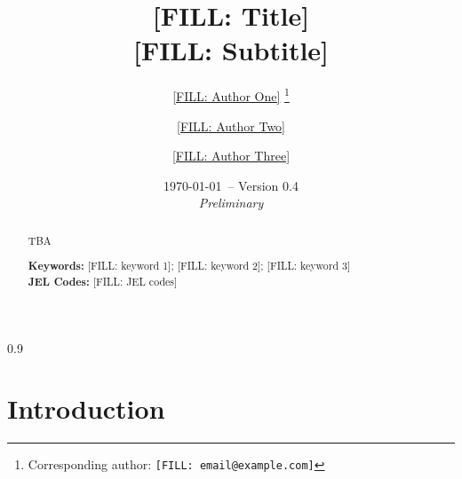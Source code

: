 \documentclass[11pt,usenames,dvipsnames]{article}
\begin{document}
\begin{spacing}{0.9}


\begin{titlepage}

\title{
\textbf{
[FILL: Title]\\
}
[FILL: Subtitle]
}



\author{
  \large \href{[FILL: URL]}{[FILL: Author One]}
  \thanks{Corresponding author: \texttt{[FILL: email@example.com]}}
  \\
  [FILL: University]
  \and
   \large \href{[FILL: URL]}{[FILL: Author Two]}
  \\
  [FILL: University]
  \and
  \large \href{[FILL: URL]}{[FILL: Author Three]}
  \\
  [FILL: University]
}

\date{\small \today \ -- Version 0.4\\ {\it Preliminary}}
\maketitle
\thispagestyle{empty}

\vspace{-0.3in}


\begin{abstract}

TBA
 \vspace{0.5cm}

\noindent \textbf{Keywords:} [FILL: keyword 1]; [FILL: keyword 2]; [FILL: keyword 3]\\
\noindent \textbf{JEL Codes:}  [FILL: JEL codes]
   
\end{abstract}

\end{titlepage}
\end{spacing}


\section{Introduction}
\end{document}

